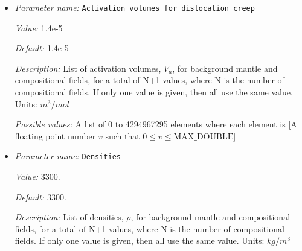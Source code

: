 \begin{itemize}
{\it Value:} 6e-6


{\it Default:} 6e-6


{\it Description:} List of activation volumes, $V_a$, for background mantle and compositional fields, for a total of N+1 values, where N is the number of compositional fields. If only one value is given, then all use the same value.  Units: $m^3 / mol$


{\it Possible values:} A list of 0 to 4294967295 elements where each element is [A floating point number $v$ such that $0 \leq v \leq \text{MAX\_DOUBLE}$]
\item {\it Parameter name:} {\tt Activation volumes for dislocation creep}
\label{parameters:Material model/Diffusion dislocation/Activation volumes for dislocation creep}
\label{parameters:Material_20model/Diffusion_20dislocation/Activation_20volumes_20for_20dislocation_20creep}


{\it Value:} 1.4e-5


{\it Default:} 1.4e-5


{\it Description:} List of activation volumes, $V_a$, for background mantle and compositional fields, for a total of N+1 values, where N is the number of compositional fields. If only one value is given, then all use the same value.  Units: $m^3 / mol$


{\it Possible values:} A list of 0 to 4294967295 elements where each element is [A floating point number $v$ such that $0 \leq v \leq \text{MAX\_DOUBLE}$]
\item {\it Parameter name:} {\tt Densities}
\label{parameters:Material model/Diffusion dislocation/Densities}
\label{parameters:Material_20model/Diffusion_20dislocation/Densities}


{\it Value:} 3300.


{\it Default:} 3300.


{\it Description:} List of densities, $\rho$, for background mantle and compositional fields, for a total of N+1 values, where N is the number of compositional fields. If only one value is given, then all use the same value.  Units: $kg / m^3$



\end{itemize}
